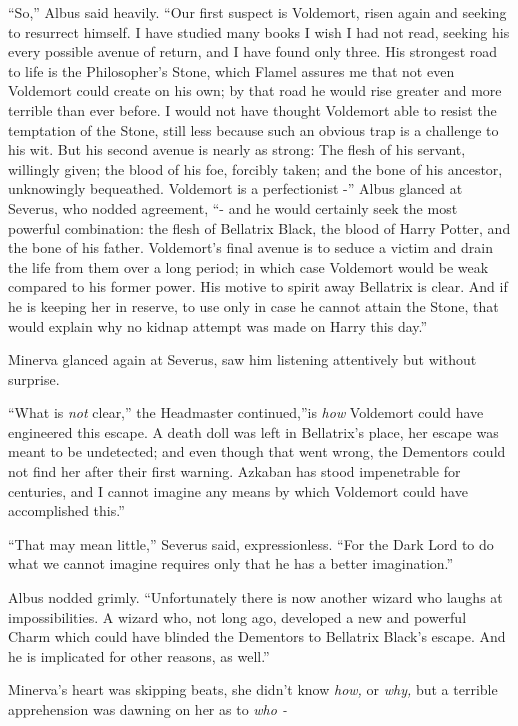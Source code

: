 ``So,'' Albus said heavily. ``Our first suspect is Voldemort, risen
again and seeking to resurrect himself. I have studied many books I wish
I had not read, seeking his every possible avenue of return, and I have
found only three. His strongest road to life is the Philosopher's Stone,
which Flamel assures me that not even Voldemort could create on his own;
by that road he would rise greater and more terrible than ever before. I
would not have thought Voldemort able to resist the temptation of the
Stone, still less because such an obvious trap is a challenge to his
wit. But his second avenue is nearly as strong: The flesh of his
servant, willingly given; the blood of his foe, forcibly taken; and the
bone of his ancestor, unknowingly bequeathed. Voldemort is a
perfectionist -'' Albus glanced at Severus, who nodded agreement, ``-
and he would certainly seek the most powerful combination: the flesh of
Bellatrix Black, the blood of Harry Potter, and the bone of his father.
Voldemort's final avenue is to seduce a victim and drain the life from
them over a long period; in which case Voldemort would be weak compared
to his former power. His motive to spirit away Bellatrix is clear. And
if he is keeping her in reserve, to use only in case he cannot attain
the Stone, that would explain why no kidnap attempt was made on Harry
this day.''

Minerva glanced again at Severus, saw him listening attentively but
without surprise.

``What is \emph{not} clear,'' the Headmaster continued,''is \emph{how}
Voldemort could have engineered this escape. A death doll was left in
Bellatrix's place, her escape was meant to be undetected; and even
though that went wrong, the Dementors could not find her after their
first warning. Azkaban has stood impenetrable for centuries, and I
cannot imagine any means by which Voldemort could have accomplished
this.''

``That may mean little,'' Severus said, expressionless. ``For the Dark
Lord to do what we cannot imagine requires only that he has a better
imagination.''

Albus nodded grimly. ``Unfortunately there is now another wizard who
laughs at impossibilities. A wizard who, not long ago, developed a new
and powerful Charm which could have blinded the Dementors to Bellatrix
Black's escape. And he is implicated for other reasons, as well.''

Minerva's heart was skipping beats, she didn't know \emph{how,} or
\emph{why,} but a terrible apprehension was dawning on her as to
\emph{who -}

